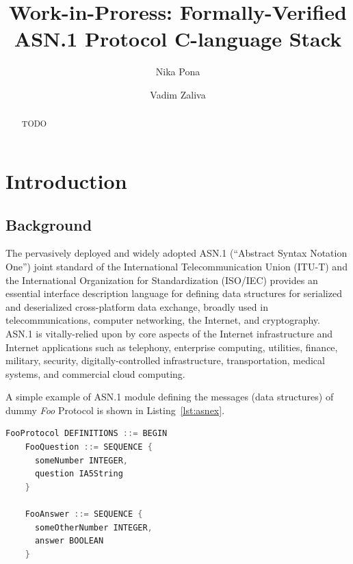 \documentclass[acmsmall,nonacm]{acmart}
\begin{document}
\title{Work-in-Proress: Formally-Verified ASN.1 Protocol C-language Stack}

\author{Nika Pona}
\author{Vadim Zaliva}

\begin{abstract}
TODO
\end{abstract}

\maketitle

\tableofcontents

\section{Introduction}

\subsection{Background}

The pervasively deployed and widely adopted ASN.1 (``Abstract Syntax
Notation One'') \cite{TODO} joint standard of the International
Telecommunication Union (ITU-T) and the International Organization for
Standardization (ISO/IEC) provides an essential interface description
language for defining data structures for serialized and deserialized
cross-platform data exchange, broadly used in telecommunications,
computer networking, the Internet, and cryptography. ASN.1 is
vitally-relied upon by core aspects of the Internet infrastructure and
Internet applications such as telephony, enterprise computing,
utilities, finance, military, security, digitally-controlled
infrastructure, transportation, medical systems, and commercial cloud
computing.

A simple example of ASN.1 module defining the messages (data
structures) of dummy \textit{Foo} Protocol is shown in
Listing~\ref{lst:asnex}.

\begin{lstlisting}[language=C,label=lst:asnex,
  caption={ASN.1 example}]  
    FooProtocol DEFINITIONS ::= BEGIN
    FooQuestion ::= SEQUENCE {
      someNumber INTEGER,
      question IA5String
    }
    
    FooAnswer ::= SEQUENCE {
      someOtherNumber INTEGER,
      answer BOOLEAN
    }
\end{lstlisting}
\end{document}
